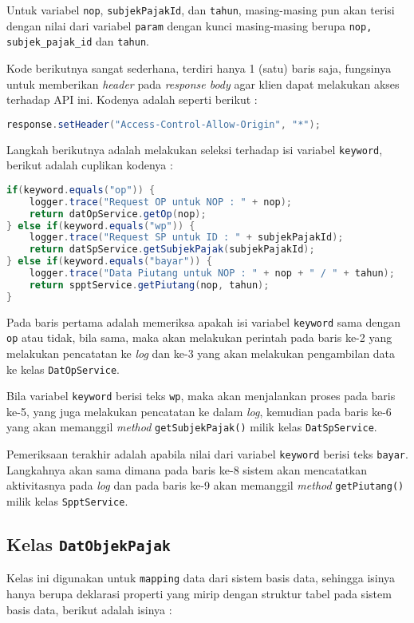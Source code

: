\documentclass[pdftex,12pt, oneside]{article}
\begin{document}
Untuk variabel \texttt{nop}, \texttt{subjekPajakId}, dan \texttt{tahun}, masing-masing pun akan terisi dengan nilai dari variabel \texttt{param} dengan kunci masing-masing berupa \texttt{nop, subjek\_pajak\_id} dan \texttt{tahun}.

Kode berikutnya sangat sederhana, terdiri hanya 1 (satu) baris saja, fungsinya untuk memberikan \textit{header} pada \textit{response body} agar klien dapat melakukan akses terhadap API ini. Kodenya adalah seperti berikut :

\begin{lstlisting}[language=java]
response.setHeader("Access-Control-Allow-Origin", "*");
\end{lstlisting}

Langkah berikutnya adalah melakukan seleksi terhadap isi variabel \texttt{keyword}, berikut adalah cuplikan kodenya :

\begin{lstlisting}[language=java]
if(keyword.equals("op")) {
	logger.trace("Request OP untuk NOP : " + nop);
	return datOpService.getOp(nop);
} else if(keyword.equals("wp")) {
	logger.trace("Request SP untuk ID : " + subjekPajakId);
	return datSpService.getSubjekPajak(subjekPajakId);
} else if(keyword.equals("bayar")) {
	logger.trace("Data Piutang untuk NOP : " + nop + " / " + tahun);
	return spptService.getPiutang(nop, tahun);
}
\end{lstlisting}

Pada baris pertama adalah memeriksa apakah isi variabel \texttt{keyword} sama dengan \texttt{op} atau tidak, bila sama, maka akan melakukan perintah pada baris ke-2 yang melakukan pencatatan ke \textit{log} dan ke-3 yang akan melakukan pengambilan data ke kelas \texttt{DatOpService}.

Bila variabel \texttt{keyword} berisi teks \texttt{wp}, maka akan menjalankan proses pada baris ke-5, yang juga melakukan pencatatan ke dalam \textit{log}, kemudian pada baris ke-6 yang akan memanggil \textit{method} \texttt{getSubjekPajak()} milik kelas \texttt{DatSpService}.

Pemeriksaan terakhir adalah apabila nilai dari variabel \texttt{keyword} berisi teks \texttt{bayar}. Langkahnya akan sama dimana pada baris ke-8 sistem akan mencatatkan aktivitasnya pada \textit{log} dan pada baris ke-9 akan memanggil \textit{method} \texttt{getPiutang()} milik kelas \texttt{SpptService}.

\subsection{Kelas \texttt{DatObjekPajak}}																																							Kelas ini digunakan untuk \texttt{mapping} data dari sistem basis data, sehingga isinya hanya berupa deklarasi properti yang mirip dengan struktur tabel pada sistem basis data, berikut adalah isinya :
\end{document}
